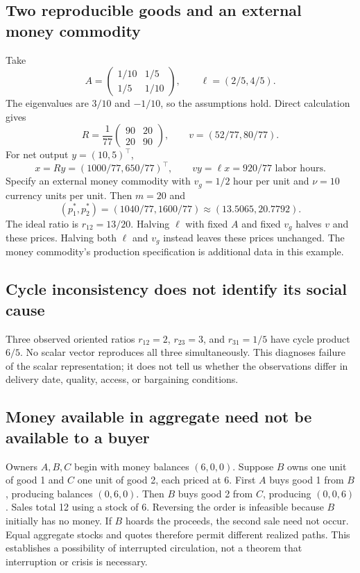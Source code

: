 \documentclass[11pt,letterpaper]{article}
\begin{document}
\subsection{Two reproducible goods and an external money commodity}
Take
\[
 A=\begin{pmatrix}1/10&1/5\\1/5&1/10\end{pmatrix},
 \qquad \ell=(2/5,4/5).
\]
The eigenvalues are $3/10$ and $-1/10$, so the assumptions hold. Direct
calculation gives
\[
 R=\frac1{77}\begin{pmatrix}90&20\\20&90\end{pmatrix},
 \qquad v=(52/77,80/77).
\]
For net output $y=(10,5)^\top$,
\[
 x=Ry=(1000/77,650/77)^\top,
 \qquad vy=\ell x=920/77\text{ labor hours}.
\]
Specify an external money commodity with $v_g=1/2$ hour per unit and
$\nu=10$ currency units per unit. Then $m=20$ and
\[
 (p_1^*,p_2^*)=(1040/77,1600/77)
       \approx(13.5065,20.7792).
\]
The ideal ratio is $r_{12}=13/20$. Halving $\ell$ with fixed $A$ and
fixed $v_g$ halves $v$ and these prices. Halving both $\ell$ and $v_g$
instead leaves these prices unchanged. The money commodity's production
specification is additional data in this example.

\subsection{Cycle inconsistency does not identify its social cause}
Three observed oriented ratios $r_{12}=2$, $r_{23}=3$, and $r_{31}=1/5$
have cycle product $6/5$. No scalar vector reproduces all three
simultaneously. This diagnoses failure of the scalar representation;
it does not tell us whether the observations differ in delivery date,
quality, access, or bargaining conditions.

\subsection{Money available in aggregate need not be available to a buyer}
Owners $A,B,C$ begin with money balances $(6,0,0)$. Suppose $B$ owns
one unit of good 1 and $C$ one unit of good 2, each priced at 6. First
$A$ buys good 1 from $B$, producing balances $(0,6,0)$. Then $B$ buys
good 2 from $C$, producing $(0,0,6)$. Sales total 12 using a stock of 6.
Reversing the order is infeasible because $B$ initially has no money.
If $B$ hoards the proceeds, the second sale need not occur. Equal
aggregate stocks and quotes therefore permit different realized paths.
This establishes a possibility of interrupted circulation, not a theorem
that interruption or crisis is necessary.
\end{document}
